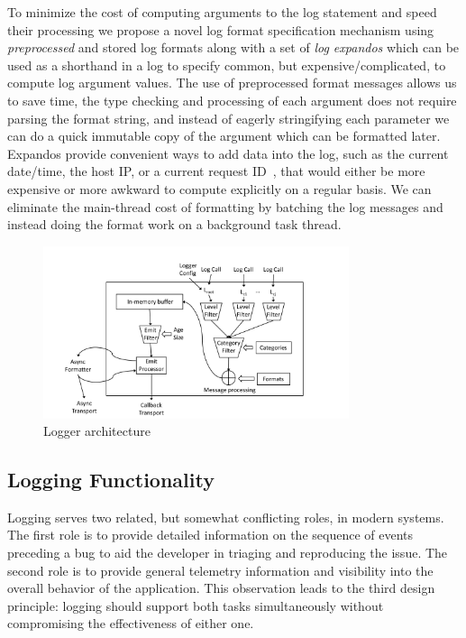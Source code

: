 To minimize the cost of computing arguments to the log statement and speed their 
processing we propose a novel log format specification mechanism using 
\emph{preprocessed} and stored log formats along with a set of \emph{log expandos} 
which can be used as a shorthand in a log to specify common, but expensive/complicated, 
to compute log argument values. The use of preprocessed format messages allows us to save time, 
the type checking and processing of each argument does not require parsing the 
format string, and instead of eagerly stringifying each parameter we can do a quick 
immutable copy of the argument which can be formatted later. Expandos provide convenient 
ways to add data into the log, such as the current date/time, the host IP, or a 
current request ID~\cite{asynchjs}, that would either be more expensive or more awkward to compute 
explicitly on a regular basis. We can eliminate the main-thread cost of formatting by batching 
the log messages and instead doing the format work on a background task thread.


\begin{figure}
    \centering
    \includegraphics[width=0.8\textwidth]{Figures/ArchDiagram}
    \caption{Logger architecture}
    \label{fig:arch}
\end{figure}

\subsection{Logging Functionality}
\label{subsec:functionalitydesign}
\begin{design}
Logging serves two related, but somewhat conflicting roles, in modern systems. 
The first role is to provide detailed information 
on the sequence of events preceding a bug to aid the developer in triaging and 
reproducing the issue. The second role is to provide general telemetry 
information and visibility into the overall behavior of the application. 
This observation leads to the third design principle: logging should 
support both tasks simultaneously without compromising the 
effectiveness of either one.
\end{design}

